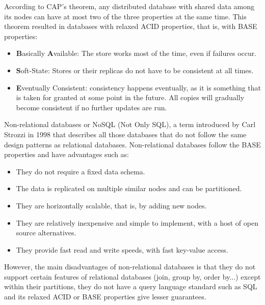 \nonzeroparskip According to CAP's theorem, any distributed database with shared data among its nodes can have at most two of the three properties at the same time. This theorem resulted in databases with relaxed ACID properties, that is, with BASE properties:
\begin{itemize}
	\item \textbf{B}asically \textbf{A}vailable: The store works most of the time, even if failures occur.
	\item \textbf{S}oft-State: Stores or their replicas do not have to be consistent at all times.
	\item \textbf{E}ventually Consistent: consistency happens eventually, as it is something that is taken for granted at some point in the future. All copies will gradually become consistent if no further updates are run.
\end{itemize}

\nonzeroparskip Non-relational databases or NoSQL (Not Only SQL), a term introduced by Carl Strozzi in 1998 that describes all those databases that do not follow the same design patterns as relational databases. Non-relational databases follow the BASE properties and have advantages such as:
\begin{itemize}
	\item They do not require a fixed data schema.
	\item The data is replicated on multiple similar nodes and can be partitioned.
	\item They are horizontally scalable, that is, by adding new nodes.
	\item They are relatively inexpensive and simple to implement, with a host of open source alternatives.
	\item They provide fast read and write speeds, with fast key-value access.
\end{itemize}

\nonzeroparskip However, the main disadvantages of non-relational databases is that they do not support certain features of relational databases (join, group by, order by...) except within their partitions, they do not have a query language standard such as SQL and its relaxed ACID or BASE properties give lesser guarantees.

